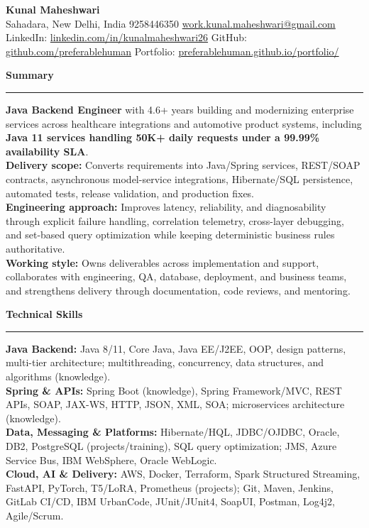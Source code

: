 \documentclass[11pt,letterpaper]{article}
\newcommand{\ressection}[1]{\Needspace{6\baselineskip}\vspace{8pt}\par\textbf{#1}\par\vspace{2pt}\hrule\vspace{5pt}}
\begin{document}
\pagestyle{empty}\raggedright\fontsize{11}{12.5}\selectfont

{\Large \textbf{Kunal Maheshwari}}\\
Sahadara, New Delhi, India \textbar{} 9258446350 \textbar{} \href{mailto:work.kunal.maheshwari@gmail.com}{work.kunal.maheshwari@gmail.com}\\
LinkedIn: \href{https://www.linkedin.com/in/kunalmaheshwari26}{linkedin.com/in/kunalmaheshwari26} \textbar{} GitHub: \href{https://github.com/preferablehuman}{github.com/preferablehuman} \textbar{} Portfolio: \href{https://preferablehuman.github.io/portfolio/}{preferablehuman.github.io/portfolio/}

\ressection{Summary}
\textbf{Java Backend Engineer} with 4.6+ years building and modernizing enterprise services across healthcare integrations and automotive product systems, including \textbf{Java 11 services handling 50K+ daily requests under a 99.99\% availability SLA}.\\[2pt]
\textbf{Delivery scope:} Converts requirements into Java/Spring services, REST/SOAP contracts, asynchronous model-service integrations, Hibernate/SQL persistence, automated tests, release validation, and production fixes.\\[2pt]
\textbf{Engineering approach:} Improves latency, reliability, and diagnosability through explicit failure handling, correlation telemetry, cross-layer debugging, and set-based query optimization while keeping deterministic business rules authoritative.\\[2pt]
\textbf{Working style:} Owns deliverables across implementation and support, collaborates with engineering, QA, database, deployment, and business teams, and strengthens delivery through documentation, code reviews, and mentoring.

\ressection{Technical Skills}
\textbf{Java Backend:} Java 8/11, Core Java, Java EE/J2EE, OOP, design patterns, multi-tier architecture; multithreading, concurrency, data structures, and algorithms (knowledge).\\
\textbf{Spring \& APIs:} Spring Boot (knowledge), Spring Framework/MVC, REST APIs, SOAP, JAX-WS, HTTP, JSON, XML, SOA; microservices architecture (knowledge).\\
\textbf{Data, Messaging \& Platforms:} Hibernate/HQL, JDBC/OJDBC, Oracle, DB2, PostgreSQL (projects/training), SQL query optimization; JMS, Azure Service Bus, IBM WebSphere, Oracle WebLogic.\\
\textbf{Cloud, AI \& Delivery:} AWS, Docker, Terraform, Spark Structured Streaming, FastAPI, PyTorch, T5/LoRA, Prometheus (projects); Git, Maven, Jenkins, GitLab CI/CD, IBM UrbanCode, JUnit/JUnit4, SoapUI, Postman, Log4j2, Agile/Scrum.
\end{document}
